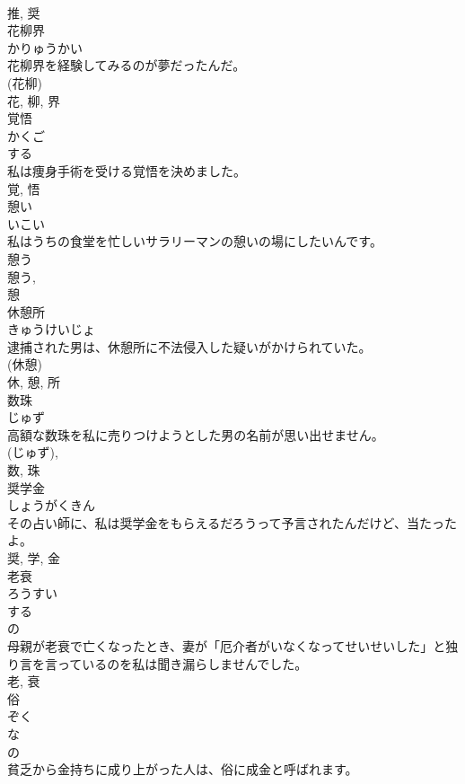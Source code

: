 \documentclass[8pt]{extreport}
\begin{document}
\begin{CJK}{UTF8}{min}
\\	推, 奨	
\\	花柳界	
\\	かりゅうかい	
\\	花柳界を経験してみるのが夢だったんだ。	
\\	(花柳) 
\\	花, 柳, 界	
\\	覚悟	
\\	かくご	
\\	する 
\\	私は痩身手術を受ける覚悟を決めました。	
\\	覚, 悟	
\\	憩い	
\\	いこい	
\\	私はうちの食堂を忙しいサラリーマンの憩いの場にしたいんです。	
\\	憩う 
\\	憩う, 
\\	憩	
\\	休憩所	
\\	きゅうけいじょ	
\\	逮捕された男は、休憩所に不法侵入した疑いがかけられていた。	
\\	(休憩) 
\\	休, 憩, 所	
\\	数珠	
\\	じゅず	
\\	高額な数珠を私に売りつけようとした男の名前が思い出せません。	
\\	(じゅず), 
\\	数, 珠	
\\	奨学金	
\\	しょうがくきん	
\\	その占い師に、私は奨学金をもらえるだろうって予言されたんだけど、当たったよ。	
\\	奨, 学, 金	
\\	老衰	
\\	ろうすい	
\\	する 
\\	の 
\\	母親が老衰で亡くなったとき、妻が「厄介者がいなくなってせいせいした」と独り言を言っているのを私は聞き漏らしませんでした。	
\\	老, 衰	
\\	俗	
\\	ぞく	
\\	な 
\\	の 
\\	貧乏から金持ちに成り上がった人は、俗に成金と呼ばれます。	

\end{CJK}
\end{document}
